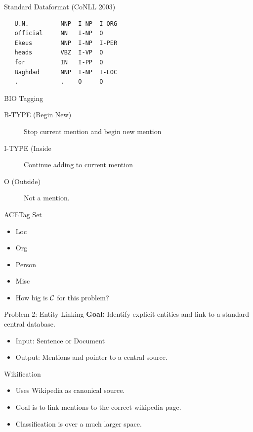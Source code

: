 \documentclass{beamer}
\begin{document}
\begin{frame}[fragile]{Standard Dataformat (CoNLL 2003)}
\begin{verbatim}
   U.N.         NNP  I-NP  I-ORG 
   official     NN   I-NP  O 
   Ekeus        NNP  I-NP  I-PER 
   heads        VBZ  I-VP  O 
   for          IN   I-PP  O 
   Baghdad      NNP  I-NP  I-LOC 
   .            .    O     O 
\end{verbatim}
\end{frame}

\begin{frame}{BIO Tagging}
  \begin{description}
  \item[B-TYPE (Begin New)] Stop current mention and begin new mention
    \air 
  \item[I-TYPE (Inside] Continue adding to current mention
  \item[O (Outside)] Not a mention.
  \end{description}
\end{frame}

\begin{frame}{ACETag Set}
  \begin{itemize}
  \item Loc
  \item Org
  \item Person
  \item Misc 
  \end{itemize}
  \air 
  
  \begin{itemize}
  \item How big is $\mathcal{C}$ for this problem?
  \end{itemize}
\end{frame}

\begin{frame}{Problem 2: Entity Linking}
  \textbf{Goal:} Identify explicit entities and link to a standard
  central database. 

  \begin{itemize}
  \item Input: Sentence or Document
  \item Output: Mentions and pointer to a central source.
  \end{itemize}
\end{frame}


\begin{frame}{Wikification }
  \begin{itemize}
  \item Uses Wikipedia as canonical source.

    \air
  \item Goal is to link mentions to the correct wikipedia page. 

    \air
  \item Classification is over a much larger space. 
  \end{itemize}
\end{frame}
\end{document}
